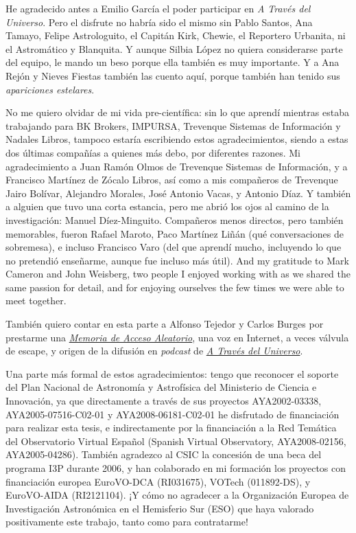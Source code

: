 	 He agradecido antes a Emilio García el poder participar en
	\emph{A Través del Universo}. Pero el disfrute no habría sido
	el mismo sin Pablo Santos, Ana Tamayo, Felipe Astrologuito, el
	Capitán Kirk, Chewie, el Reportero Urbanita, ni el Astromático
	y Blanquita. Y aunque Silbia López no quiera considerarse parte
	del equipo, le mando un beso porque ella también es muy
	importante. Y a Ana Rejón y Nieves Fiestas también las cuento
	aquí, porque también han tenido sus \emph{apariciones
	estelares}.
	
	 No me quiero olvidar de mi vida pre-científica: sin lo que
	aprendí mientras estaba trabajando para BK Brokers, IMPURSA,
	Trevenque Sistemas de Información y Nadales Libros, tampoco
	estaría escribiendo estos agradecimientos, siendo a estas dos
	últimas compañías a quienes más debo, por diferentes razones.
	Mi agradecimiento a Juan Ramón Olmos de Trevenque Sistemas de
	Información, y a Francisco Martínez de Zócalo Libros, así como
	a mis compañeros de Trevenque Jairo Bolívar, Alejandro Morales,
	José Antonio Vacas, y Antonio Díaz. Y también a alguien que
	tuvo una corta estancia, pero me abrió los ojos al camino de la
	investigación: Manuel Díez-Minguito. Compañeros menos directos,
	pero también memorables, fueron Rafael Maroto, Paco Martínez
	Liñán (qué conversaciones de sobremesa), e incluso Francisco
	Varo (del que aprendí mucho, incluyendo lo que no pretendió
	enseñarme, aunque fue incluso más útil). And my gratitude to
	Mark Cameron and John Weisberg, two people I enjoyed working
	with as we shared the same passion for detail, and for enjoying
	ourselves the few times we were able to meet together.
	
	 También quiero contar en esta parte a Alfonso Tejedor y Carlos
	Burges por prestarme una
	\href{http://www.entremaqueros.com/bitacoras/memoria/}{
	\emph{Memoria de Acceso Aleatorio}}, una voz en Internet, a
	veces válvula de escape, y origen de la difusión en
	\emph{podcast} de \href{http://universo.iaa.es/}{\emph{A Través
	del Universo}}.
	
	 Una parte más formal de estos agradecimientos: tengo que
	reconocer el soporte del Plan Nacional de Astronomía y
	Astrofísica del Ministerio de Ciencia e Innovación, ya que
	directamente a través de sus proyectos AYA2002-03338,
	AYA2005-07516-C02-01 y AYA2008-06181-C02-01 he disfrutado de
	financiación para realizar esta tesis, e indirectamente por la
	financiación a la Red Temática del Observatorio Virtual Español
	(Spanish Virtual Observatory, AYA2008-02156, AYA2005-04286).
	También agradezco al CSIC la concesión de una beca del programa
	I3P durante 2006, y han colaborado en mi formación los
	proyectos con financiación europea EuroVO-DCA (RI031675),
	VOTech (011892-DS), y EuroVO-AIDA (RI2121104). ¡Y cómo no
	agradecer a la Organización Europea de Investigación
	Astronómica en el Hemisferio Sur (ESO) que haya valorado
	positivamente este trabajo, tanto como para contratarme!
	

